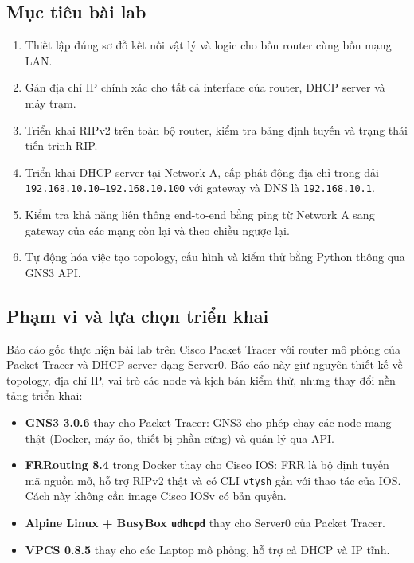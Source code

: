 \documentclass[12pt,a4paper]{article}
\begin{document}
\subsection{Mục tiêu bài lab}

\begin{enumerate}[leftmargin=1.7em,itemsep=2pt]
  \item Thiết lập đúng sơ đồ kết nối vật lý và logic cho bốn router cùng bốn mạng LAN.
  \item Gán địa chỉ IP chính xác cho tất cả interface của router, DHCP server và máy trạm.
  \item Triển khai RIPv2 trên toàn bộ router, kiểm tra bảng định tuyến và trạng thái tiến trình RIP.
  \item Triển khai DHCP server tại Network A, cấp phát động địa chỉ trong dải
        \texttt{192.168.10.10--192.168.10.100} với gateway và DNS là \texttt{192.168.10.1}.
  \item Kiểm tra khả năng liên thông end-to-end bằng ping từ Network A sang gateway của các mạng
        còn lại và theo chiều ngược lại.
  \item Tự động hóa việc tạo topology, cấu hình và kiểm thử bằng Python thông qua GNS3 API.
\end{enumerate}

\subsection{Phạm vi và lựa chọn triển khai}

Báo cáo gốc thực hiện bài lab trên Cisco Packet Tracer với router mô phỏng của Packet Tracer và
DHCP server dạng Server0. Báo cáo này giữ nguyên thiết kế về topology, địa chỉ IP, vai trò các
node và kịch bản kiểm thử, nhưng thay đổi nền tảng triển khai:

\begin{itemize}[leftmargin=1.6em,itemsep=2pt]
  \item \textbf{GNS3 3.0.6} thay cho Packet Tracer: GNS3 cho phép chạy các node mạng thật
        (Docker, máy ảo, thiết bị phần cứng) và quản lý qua API.
  \item \textbf{FRRouting 8.4} trong Docker thay cho Cisco IOS: FRR là bộ định tuyến mã nguồn mở,
        hỗ trợ RIPv2 thật và có CLI \texttt{vtysh} gần với thao tác của IOS. Cách này không cần
        image Cisco IOSv có bản quyền.
  \item \textbf{Alpine Linux + BusyBox \texttt{udhcpd}} thay cho Server0 của Packet Tracer.
  \item \textbf{VPCS 0.8.5} thay cho các Laptop mô phỏng, hỗ trợ cả DHCP và IP tĩnh.
\end{itemize}
\end{document}
